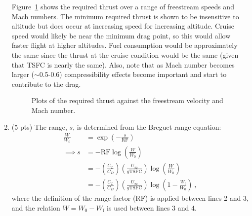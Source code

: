 \documentclass[12pt]{article}
\begin{document}
\begin{enumerate}[label=(\alph*)]
		Figure~\ref{FIG_1} shows the required thrust over a range of freestream speeds and Mach numbers. The minimum required thrust is shown to be insensitive to altitude but does occur at increasing speed for increasing altitude. Cruise speed would likely be near the minimum drag point, so this would allow faster flight at higher altitudes. Fuel consumption would be approximately the same since the thrust at the cruise condition would be the same (given that TSFC is nearly the same). Also, note that as Mach number becomes larger ($\sim$0.5-0.6) compressibility effects become important and start to contribute to the drag.
		\begin{figure}[!t!]
			\begin{center}
				\caption{\label{FIG_1} Plots of the required thrust against the freestream velocity and Mach number.}
			\end{center}
		\end{figure}
	\item (5 pts)
		The range, $s$, is determined from the Breguet range equation: 
		\begin{equation}
			\label{EQ_1_RANGE}
			\begin{aligned}
				\frac{W}{W_0}&=\exp\left(-\frac{s}{\mathrm{RF}}\right)\\
				\implies s&=-\mathrm{RF}\log\left(\frac{W}{W_0}\right) \\
				&=-\left(\frac{C_L}{C_D}\right)\left(\frac{U_\infty}{g\mathrm{TSFC}}\right)\log\left(\frac{W}{W_0}\right) \\
				&=-\left(\frac{C_L}{C_D}\right)\left(\frac{U_\infty}{g\mathrm{TSFC}}\right)\log\left(1-\frac{W_\mathrm{f}}{W_0}\right)\ ,
			\end{aligned}	
		\end{equation}
		where the definition of the range factor (RF) is applied between lines 2 and 3, and the relation $W=W_0-W_\mathrm{f}$ is used between lines 3 and 4.
		

\end{enumerate}
\end{document}
